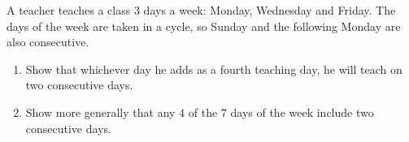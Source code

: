 A teacher teaches a class $3$ days a week: Monday, Wednesday and Friday. The days of the week are taken in a cycle, so Sunday and the following Monday are also consecutive.
\begin{enumerate}
\item[(a)] Show that whichever day he adds as a fourth teaching day, he will teach on two consecutive days.
\item[(b)] Show more generally that any $4$ of the $7$ days of the week include two consecutive days.
\end{enumerate}
